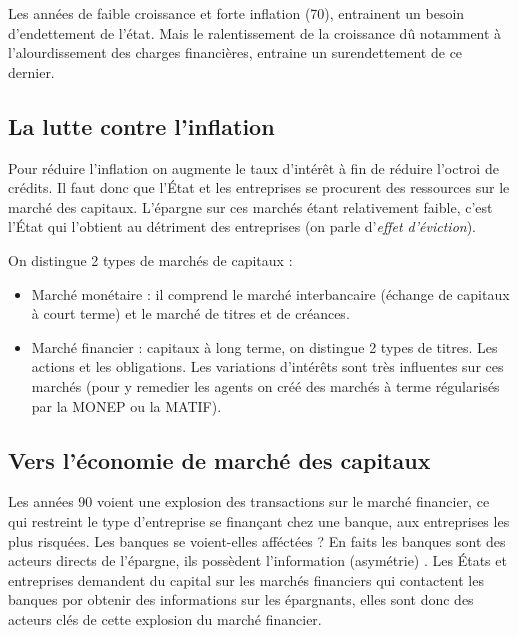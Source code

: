 Les années de faible croissance et forte inflation (70), entrainent un besoin d'endettement de l'état. Mais le ralentissement de la croissance dû notamment à 
l'alourdissement des charges financières, entraine un surendettement de ce dernier.

\subsection{La lutte contre l'inflation} %
\label{sub:la_lutte_contre_l_inflation}

Pour réduire l'inflation on augmente le taux d'intérêt à fin de réduire l'octroi de crédits. Il faut donc que l'État et les entreprises se procurent des 
ressources sur le marché des capitaux. L'épargne sur ces marchés étant relativement faible, c'est l'État qui l'obtient au détriment des entreprises (on parle
d'\emph{effet d'éviction}).

On distingue 2 types de marchés de capitaux : 
\begin{itemize}[label=]
	\item Marché monétaire : il comprend le marché interbancaire (échange de capitaux à court terme) et le marché de titres et de créances.
	\item Marché financier : capitaux à long terme, on distingue 2 types de titres. Les actions et les obligations. Les variations d'intérêts sont très influentes sur ces marchés (pour y remedier les agents on créé des marchés à terme régularisés par la MONEP ou la MATIF).
\end{itemize}


\subsection{Vers l'économie de marché des capitaux} %
\label{sub:vers_l_economie_de_marche_des_capitaux}

Les années 90 voient une explosion des transactions sur le marché financier, ce qui restreint le type d'entreprise se finançant chez une banque, aux entreprises
les plus risquées. Les banques se voient-elles afféctées ? En faits les banques sont des acteurs directs de l'épargne, ils possèdent l'information (asymétrie)
. Les États et entreprises demandent du capital sur les marchés financiers qui contactent les banques por obtenir des informations sur les épargnants, elles 
sont donc des acteurs clés de cette explosion du marché financier.

